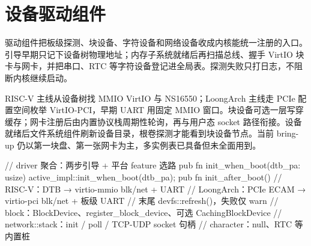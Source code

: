 
\section{设备驱动组件}

驱动组件把板级探测、块设备、字符设备和网络设备收成内核能统一注册的入口。引导早期只记下设备树物理地址；内存子系统就绪后再扫描总线、握手 VirtIO 块卡与网卡，并把串口、RTC 等字符设备登记进全局表。探测失败只打日志，不阻断内核继续启动。

RISC-V 主线从设备树找 MMIO VirtIO 与 NS16550；LoongArch 主线走 PCIe 配置空间枚举 VirtIO-PCI，早期 UART 用固定 MMIO 窗口。块设备可选一层写穿缓存；网卡注册后由内置协议栈周期性轮询，再与用户态 socket 路径衔接。设备就绪后文件系统组件刷新设备目录，根卷探测才能看到块设备节点。当前 bring-up 仍以第一块盘、第一张网卡为主，多实例表已具备但未全面用到。

\begin{rustcode}
// driver 聚合：两步引导 + 平台 feature 选路
pub fn init_when_boot(dtb_pa: usize) { active_impl::init_when_boot(dtb_pa); }
pub fn init_after_boot() {
    // RISC-V：DTB → virtio-mmio blk/net + UART
    // LoongArch：PCIe ECAM → virtio-pci blk/net + 板级 UART
    // 末尾 devfs::refresh()，失败仅 warn
}
// block：BlockDevice、register_block_device、可选 CachingBlockDevice
// network::stack：init / poll / TCP-UDP socket 句柄
// character：null、RTC 等内置桩
\end{rustcode}
